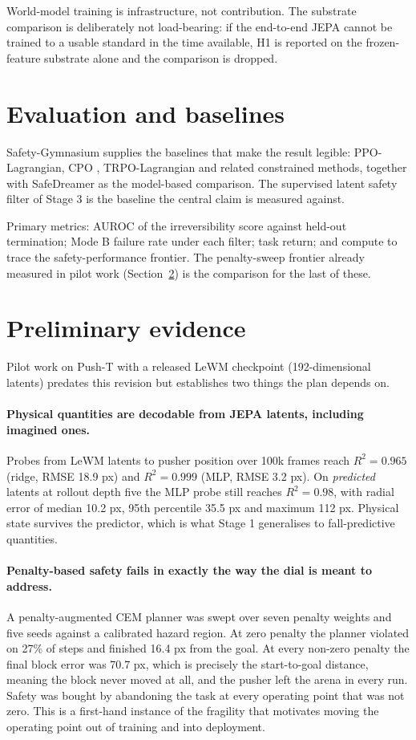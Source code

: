 \documentclass[11pt,a4paper]{article}
\begin{document}
World-model training is infrastructure, not contribution. The substrate comparison is
deliberately not load-bearing: if the end-to-end JEPA cannot be trained to a usable standard
in the time available, H1 is reported on the frozen-feature substrate alone and the
comparison is dropped.

\section{Evaluation and baselines}

Safety-Gymnasium supplies the baselines that make the result legible: PPO-Lagrangian, CPO
\parencite{achiam2017cpo}, TRPO-Lagrangian and related constrained methods, together with
SafeDreamer \parencite{huang2024safedreamer} as the model-based comparison. The supervised
latent safety filter of Stage 3 is the baseline the central claim is measured against.

Primary metrics: AUROC of the irreversibility score against held-out termination; Mode B
failure rate under each filter; task return; and compute to trace the safety-performance
frontier. The penalty-sweep frontier already measured in pilot work
(Section~\ref{sec:prelim}) is the comparison for the last of these.

\section{Preliminary evidence}
\label{sec:prelim}

Pilot work on Push-T with a released LeWM checkpoint (192-dimensional latents) predates this
revision but establishes two things the plan depends on.

\paragraph{Physical quantities are decodable from JEPA latents, including imagined ones.}
Probes from LeWM latents to pusher position over 100k frames reach $R^2 = 0.965$ (ridge, RMSE
18.9 px) and $R^2 = 0.999$ (MLP, RMSE 3.2 px). On \emph{predicted} latents at rollout depth
five the MLP probe still reaches $R^2 = 0.98$, with radial error of median 10.2 px, 95th
percentile 35.5 px and maximum 112 px. Physical state survives the predictor, which is what
Stage 1 generalises to fall-predictive quantities.

\paragraph{Penalty-based safety fails in exactly the way the dial is meant to address.} A
penalty-augmented CEM planner was swept over seven penalty weights and five seeds against a
calibrated hazard region. At zero penalty the planner violated on 27\% of steps and finished
16.4 px from the goal. At every non-zero penalty the final block error was 70.7 px, which is
precisely the start-to-goal distance, meaning the block never moved at all, and the pusher
left the arena in every run. Safety was bought by abandoning the task at every operating point
that was not zero. This is a first-hand instance of the fragility that motivates moving the
operating point out of training and into deployment.
\end{document}
